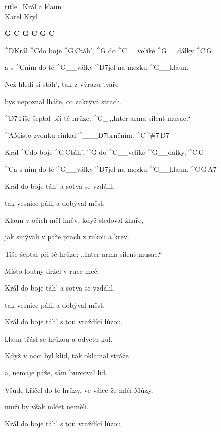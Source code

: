 \begin{song}{title=\predtitle\centering Král a klaun \\\large Karel Kryl  \vspace*{-0.8cm}}  %
\begin{centerjustified}

\predehra
\textbf{G C G C G C}

\sloka 
	^{D}Král ^{C}do boje ^{G\,C}táh', ^{G} do ^{C{\color{white}\_\_}}veliké ^{G{\color{white}\_\_}}dálky ^{C\,G}

	a s ^{C}ním do té ^{G{\color{white}\_\_}}války ^{D7}jel na mezku ^{G{\color{white}\_\_}}klaun.

	Než hledí si stáh', tak z výrazu tváře

	bys nepoznal lháře, co zakrývá strach.

	^{D7}Tiše šeptal při té hrůze: ^{G{\color{white}\_\,}},,Inter arma silent musae.``

	^{A}Místo zvonku cinkal ^{{\color{white}\_\_\_}D7}brněním. ^{C^{\#}7\,D7}

	Král ^{C}do boje ^{G\,C}táh', ^{G} do ^{C{\color{white}\_\_}}veliké ^{G{\color{white}\_\_}}dálky,  ^{C\,G}

	^{C}a s ním do té ^{G{\color{white}\_\_}}války ^{D7}jel na mezku ^{G{\color{white}\_\_}}klaun.  ^{C\,G\,A7}

\sloka
	Král do boje táh' a sotva se vzdálil,
	
	tak vesnice pálil a dobýval měst.

	Klaun v očích měl hněv, když sledoval žháře,

	jak smývali v páře prach z rukou a krev.
	
	Tiše šeptal při té hrůze: ,,Inter arma silent musae.``
	
	Místo loutny držel v ruce meč.

	Král do boje táh' a sotva se vzdálil,
   
	tak vesnice pálil a dobýval měst.

\sloka
	Král do boje táh' s tou vraždící lůzou,
	
	klaun třásl se hrůzou a odvetu kul.

	Když v noci byl klid, tak oklamal stráže
	
	a, nemaje páže, sám burcoval lid.
	
	Všude křičel do té hrůzy, ve válce že mlčí Múzy,
	
	muži by však mlčet neměli.

	Král do boje táh' s tou vraždící lůzou,


\end{centerjustified}
\end{song}
